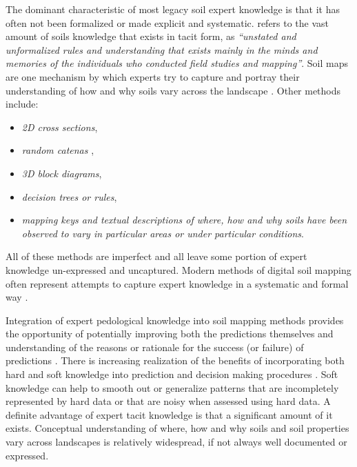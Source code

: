\documentclass[graybox,natbib,nospthms,UStrade]{svmono}
\begin{document}
The dominant characteristic of most legacy soil expert knowledge is that
it has often not been formalized or made explicit and systematic.
\citet{Hudson2000SSSAJ} refers to the vast amount of soils knowledge that
exists in tacit form, as \emph{``unstated and unformalized rules and
understanding that exists mainly in the minds and memories of the
individuals who conducted field studies and mapping''}. Soil maps are one
mechanism by which experts try to capture and portray their
understanding of how and why soils vary across the landscape
\citep{Bui2004Geoderma}. Other methods include:

\begin{itemize}
\item
  \emph{2D cross sections},
\item
  \emph{random catenas} \citep{McBratney2006WCSS},
\item
  \emph{3D block diagrams},
\item
  \emph{decision trees or rules},
\item
  \emph{mapping keys and textual descriptions of where, how and why soils
  have been observed to vary in particular areas or under particular
  conditions}.
\end{itemize}

All of these methods are imperfect and all leave some portion of expert
knowledge un-expressed and uncaptured. Modern methods of digital soil
mapping often represent attempts to capture expert knowledge in a
systematic and formal way
\citep{Zhu2001, McBratney2003Geoderma, Bui2004Geoderma, MacMillan2005CJSS}.

Integration of expert pedological knowledge into soil mapping methods
provides the opportunity of potentially improving both the predictions
themselves and understanding of the reasons or rationale for the success
(or failure) of predictions
\citep{Walter2006DSS, Lagacherie1995Geoderma, Lagacherie2001Geoderm}. There
is increasing realization of the benefits of incorporating both hard and
soft knowledge into prediction and decision making procedures
\citep{christakos2001temporal}. Soft knowledge can help to smooth out or
generalize patterns that are incompletely represented by hard data or
that are noisy when assessed using hard data. A definite advantage of
expert tacit knowledge is that a significant amount of it exists.
Conceptual understanding of where, how and why soils and soil properties
vary across landscapes is relatively widespread, if not always well
documented or expressed.
\end{document}
